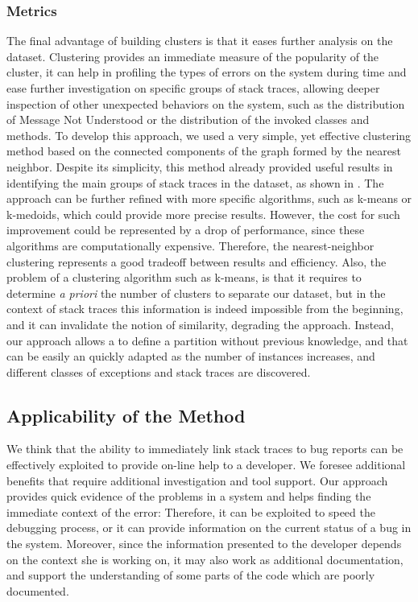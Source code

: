 \subsubsection{Metrics}
The final advantage of building clusters is that it eases further analysis on the dataset.
Clustering provides an immediate measure of the popularity of the cluster, it can help in profiling the types of errors on the system during time and ease further investigation on specific groups of stack traces, allowing deeper inspection of other unexpected behaviors on the system, such as the distribution of Message Not Understood or  the distribution of the invoked classes and methods.
To develop this approach, we used a very simple, yet effective clustering method based on the connected components of the graph formed by the nearest neighbor.
Despite its simplicity, this method already provided useful results in identifying the main groups of stack traces in the dataset, as shown in .
The approach can be further refined with more specific algorithms, such as k-means\cite{MacQ1967} or k-medoids\cite{Kauf1987,Park2009}, which could provide more precise results.
However, the cost for such improvement could be represented by a drop of performance, since these algorithms are computationally expensive.
Therefore, the nearest-neighbor clustering  represents a good tradeoff between results and efficiency.
Also, the problem of a clustering algorithm such as k-means, is that it requires to determine \emph{a priori} the number of clusters to separate our dataset, but in the context of stack traces this information is indeed impossible from the beginning, and it can invalidate the notion of similarity, degrading the approach.
Instead, our approach allows a to define a partition without previous knowledge, and that can be easily an quickly adapted as the number of instances increases, and different classes of exceptions and stack traces are discovered.


\subsection{Applicability of the Method}

We think that the ability to immediately link stack traces to bug reports can be effectively exploited to provide on-line help to a developer.
We foresee additional benefits that require additional investigation and tool support.
Our approach provides quick evidence of the problems in a system and helps finding the immediate context of the error: Therefore, it can be exploited to speed the debugging process, or it can provide information on the current status of a bug in the system.
Moreover, since the information presented to the developer depends on the context she is working on, it may also work as additional documentation, and support the understanding of some parts of the code which are poorly documented.

